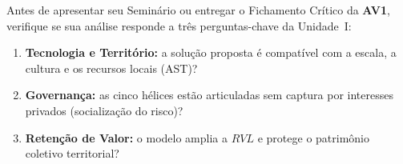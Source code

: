 \begin{boxDica}
Antes de apresentar seu Seminário ou entregar o Fichamento Crítico da \textbf{AV1}, verifique se sua análise responde a três perguntas-chave da Unidade~I:
\begin{enumerate}[leftmargin=1.4em, itemsep=2pt]
  \item \textbf{Tecnologia e Território:} a solução proposta é compatível com a escala, a cultura e os recursos locais (AST)?
  \item \textbf{Governança:} as cinco hélices estão articuladas sem captura por interesses privados (socialização do risco)?
  \item \textbf{Retenção de Valor:} o modelo amplia a $RVL$ e protege o patrimônio coletivo territorial?
\end{enumerate}
\end{boxDica}

\clearpage
{}


